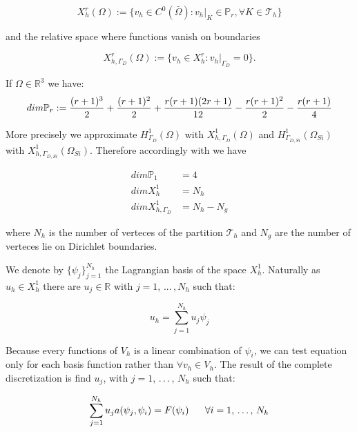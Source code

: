 \begin{equation}
X^r_h(\Omega) := \{v_h \in C^0(\bar{\Omega}): v_h|_K\in \mathbb{P}_r,\forall K \in \mathcal{T}_h \}
\end{equation}

and the relative space where functions vanish on boundaries

\begin{equation}
X^r_{h,\Gamma_D}(\Omega)  := \{ v_h \in X^r_h: v_h|_{\Gamma_D} = 0 \} .
\end{equation}

If $\Omega \in \mathbb{R}^3$ we have:
\begin{equation}
\small
\label{eq: dimensione polinomi}
dim\mathbb{P}_r := \dfrac{(r+1)^3}{2} + \dfrac{(r+1)^2}{2} + \dfrac{r(r+1)(2r+1)}{12} - \dfrac{r(r+1)^2}{2} - \dfrac{r(r+1)}{4}
\end{equation}

More precisely we approximate $H^1_{\Gamma_D}(\Omega)$ with $X^1_{h,\Gamma_D}(\Omega)$ and $H^1_{\Gamma_{D,Si}}(\Omega_{Si})$ with $X^1_{h,\Gamma_{D,Si}}(\Omega_{Si})$. Therefore accordingly with  we have

\begin{align*}
dim \mathbb{P}_1 & = 4 \\
dim X^1_h & = N_h \\
dim X^1_{h,\Gamma_D} & = N_h - N_g
\end{align*}

where $N_h$ is the number of verteces of the partition $\mathcal{T}_h$ and $N_g$ are the number of verteces lie on Dirichlet boundaries.

We denote by $\{ \psi_j \}_{j=1}^{N_h} $ the Lagrangian basis of the space $X^1_{h}$. Naturally  as $u_h \in X^1_{h}$ there are $u_j \in \mathbb{R}$ with $j=1,\, ... \,, N_h$ such that:


\begin{equation}
u_h = \sum_{j=1}^{N_h} u_j \psi_j
\end{equation}

Because every functions of $V_h$ is a linear combination of $\psi_i$, we can test equation  only for each basis function rather than $\forall v_h \in V_h$. The result of the complete discretization is find $u_j$, with $j = 1, \, . \, . \, . \, , \, N_h$ such that:

\begin{equation}
\sum_{j=1}^{N_h}u_ja(\psi_j,\psi_i) = F(\psi_i) \psp{10} \forall i = 1, \, . \, . \, . \, , \, N_h
\end{equation}

